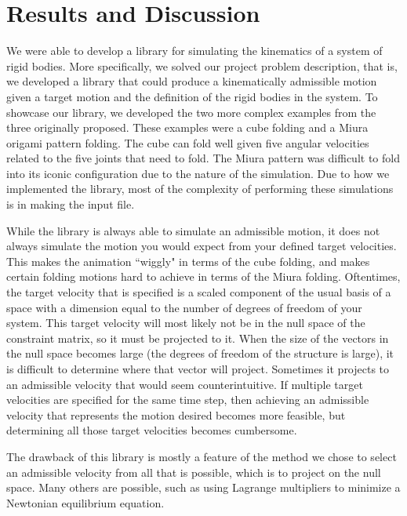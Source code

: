 \section{Results and Discussion}
We were able to develop a library for simulating the kinematics of a system of rigid bodies. More specifically, we solved our project problem description, that is, we developed a library that could produce a kinematically admissible motion given a target motion and the definition of the rigid bodies in the system. To showcase our library, we developed the two more complex examples from the three originally proposed. These examples were a cube folding and a Miura origami pattern folding. The cube can fold well given five angular velocities related to the five joints that need to fold. The Miura pattern was difficult to fold into its iconic configuration due to the nature of the simulation. Due to how we implemented the library, most of the complexity of performing these simulations is in making the input file.

While the library is always able to simulate an admissible motion, it does not always simulate the motion you would expect from your defined target velocities. This makes the animation ``wiggly" in terms of the cube folding, and makes certain folding motions hard to achieve in terms of the Miura folding. Oftentimes, the target velocity that is specified is a scaled component of the usual basis of a space with a dimension equal to the number of degrees of freedom of your system. This target velocity will most likely not be in the null space of the constraint matrix, so it must be projected to it. When the size of the vectors in the null space becomes large (the degrees of freedom of the structure is large), it is difficult to determine where that vector will project. Sometimes it projects to an admissible velocity that would seem counterintuitive. If multiple target velocities are specified for the same time step, then achieving an admissible velocity that represents the motion desired becomes more feasible, but determining all those target velocities becomes cumbersome. 

The drawback of this library is mostly a feature of the method we chose to select an admissible velocity from all that is possible, which is to project on the null space. Many others are possible, such as using Lagrange multipliers to minimize a Newtonian equilibrium equation.


